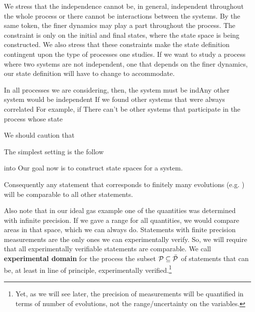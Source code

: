 \documentclass[letterpaper]{article}
\begin{document}
We stress that the independence cannot be, in general, independent throughout the whole process or there cannot be interactions between the systems. By the same token, the finer dynamics may play a part throughout the process. The constraint is only on the initial and final states, where the state space is being constructed. We also stress that these constraints make the state definition contingent upon the type of processes one studies. If we want to study a process where two systems are not independent, one that depends on the finer dynamics, our state definition will have to change to accommodate.






 In all processes we are considering, then, the system must be indAny other system would be independent If we found other systems that were always correlated For example, if  There can't be other systems that participate in the process whose state 



We should caution that 

The simplest setting is the follow

 into Our goal now is to construct state spaces for a system.


 Consequently any statement that corresponds to finitely many evolutions (e.g. ) will be comparable to all other statements.

Also note that in our ideal gas example one of the quantities was determined with infinite precision. If we gave a range for all quantities, we would compare areas in that space, which we can always do. Statements with finite precision measurements are the only ones we can experimentally verify. So, we will require that all experimentally verifiable statements are comparable. We call \textbf{experimental domain} for the process the subset $\edomain[P] \subseteq \tdomain[P]$ of statements that can be, at least in line of principle, experimentally verified.\footnote{Yet, as we will see later, the precision of measurements will be quantified in terms of number of evolutions, not the range/uncertainty on the variables.}
\end{document}
